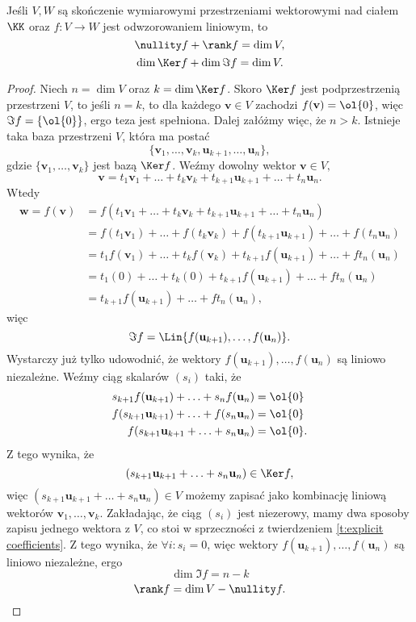 \begin{theorem}[o rzędzie]
    \label{t:rank-nullity}
    Jeśli $V, W$ są skończenie wymiarowymi przestrzeniami wektorowymi nad ciałem $\KK$ oraz $f : V \to W$ jest odwzorowaniem liniowym, to
    \[ \nullity f + \rank f = \dim V, \]
    \[ \dim \Ker f + \dim \Im f = \dim V. \]
\end{theorem}
\begin{proof}
    Niech $n = \dim V$ oraz $k = \dim \Ker f$. Skoro $\Ker f$ jest podprzestrzenią przestrzeni $V$, to jeśli $n = k$, to dla każdego $\mathbf{v} \in V$ zachodzi $f(\mathbf{v}) = \ol{0}$, więc $\Im f = \{\ol{0}\}$, ergo teza jest spełniona. Dalej załóżmy więc, że $n > k$. Istnieje taka baza przestrzeni $V$, która ma postać
    \[ \{\mathbf{v}_1, \ldots, \mathbf{v}_k, \mathbf{u}_{k+1}, \ldots, \mathbf{u}_n\}, \]
    gdzie $\{\mathbf{v}_1, \ldots, \mathbf{v}_k\}$ jest bazą $\Ker f$. Weźmy dowolny wektor $\mathbf{v} \in V,$
    \[ \mathbf{v} = t_1\mathbf{v}_1 + \ldots + t_k\mathbf{v}_k + t_{k+1}\mathbf{u}_{k+1} + \ldots + t_n\mathbf{u}_n. \]
    Wtedy
    \begin{align*}
        \mathbf{w} = f(\mathbf{v}) &= f(t_1\mathbf{v}_1 + \ldots + t_k\mathbf{v}_k + t_{k+1}\mathbf{u}_{k+1} + \ldots + t_n\mathbf{u}_n) \\
            &= f(t_1\mathbf{v}_1) + \ldots + f(t_k\mathbf{v}_k) + f(t_{k+1}\mathbf{u}_{k+1}) + \ldots + f(t_n\mathbf{u}_n) \\
            &= t_1f(\mathbf{v}_1) + \ldots + t_kf(\mathbf{v}_k) + t_{k+1}f(\mathbf{u}_{k+1}) + \ldots + ft_n(\mathbf{u}_n) \\
            &= t_1(0) + \ldots + t_k(0) + t_{k+1}f(\mathbf{u}_{k+1}) + \ldots + ft_n(\mathbf{u}_n) \\
            &= t_{k+1}f(\mathbf{u}_{k+1}) + \ldots + ft_n(\mathbf{u}_n),
    \end{align*}
    więc
    \[ \Im f = \Lin\{f(\mathbf{u}_{k+1}), \ldots, f(\mathbf{u}_n)\}. \]
    Wystarczy już tylko udowodnić, że wektory $f(\mathbf{u}_{k+1}), \ldots, f(\mathbf{u}_n)$ są liniowo niezależne. Weźmy ciąg skalarów $(s_i)$ taki, że
    \begin{align*}
        s_{k+1}f(\mathbf{u}_{k+1}) + \ldots + s_nf(\mathbf{u}_n) &= \ol{0} \\
        f(s_{k+1}\mathbf{u}_{k+1}) + \ldots + f(s_n\mathbf{u}_n) &= \ol{0} \\
        f(s_{k+1}\mathbf{u}_{k+1} + \ldots + s_n\mathbf{u}_n) &= \ol{0}.
    \end{align*}
    Z tego wynika, że
    \[ (s_{k+1}\mathbf{u}_{k+1} + \ldots + s_n\mathbf{u}_n) \in \Ker f, \]
    więc $(s_{k+1}\mathbf{u}_{k+1} + \ldots + s_n\mathbf{u}_n) \in V$ możemy zapisać jako kombinację liniową wektorów $\mathbf{v}_1, \ldots, \mathbf{v}_k$. Zakładając, że ciąg $(s_i)$ jest niezerowy, mamy dwa sposoby zapisu jednego wektora z $V$, co stoi w sprzeczności z twierdzeniem \ref{t:explicit coefficients}. Z tego wynika, że $\forall i : s_i = 0$, więc wektory $f(\mathbf{u}_{k+1}), \ldots, f(\mathbf{u}_n)$ są liniowo niezależne, ergo
    \[ \dim \Im f = n - k \]
    \[ \rank f = \dim V - \nullity f. \]
\end{proof}

